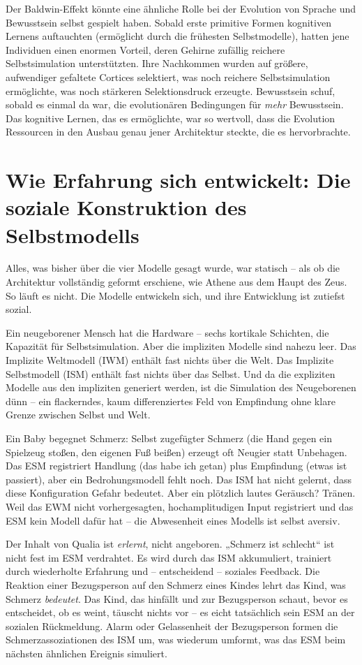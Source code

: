 \documentclass[11pt, twoside, openright]{book}
\begin{document}
Der Baldwin-Effekt könnte eine ähnliche Rolle bei der Evolution von Sprache und Bewusstsein selbst gespielt haben. Sobald erste primitive Formen kognitiven Lernens auftauchten (ermöglicht durch die frühesten Selbstmodelle), hatten jene Individuen einen enormen Vorteil, deren Gehirne zufällig reichere Selbstsimulation unterstützten. Ihre Nachkommen wurden auf größere, aufwendiger gefaltete Cortices selektiert, was noch reichere Selbstsimulation ermöglichte, was noch stärkeren Selektionsdruck erzeugte. Bewusstsein schuf, sobald es einmal da war, die evolutionären Bedingungen für \textit{mehr} Bewusstsein. Das kognitive Lernen, das es ermöglichte, war so wertvoll, dass die Evolution Ressourcen in den Ausbau genau jener Architektur steckte, die es hervorbrachte.

\section*{Wie Erfahrung sich entwickelt: Die soziale Konstruktion des Selbstmodells}

Alles, was bisher über die vier Modelle gesagt wurde, war statisch -- als ob die Architektur vollständig geformt erschiene, wie Athene aus dem Haupt des Zeus. So läuft es nicht. Die Modelle entwickeln sich, und ihre Entwicklung ist zutiefst sozial.

Ein neugeborener Mensch hat die Hardware -- sechs kortikale Schichten, die Kapazität für Selbstsimulation. Aber die impliziten Modelle sind nahezu leer. Das Implizite Weltmodell (IWM) enthält fast nichts über die Welt. Das Implizite Selbstmodell (ISM) enthält fast nichts über das Selbst. Und da die expliziten Modelle aus den impliziten generiert werden, ist die Simulation des Neugeborenen dünn -- ein flackerndes, kaum differenziertes Feld von Empfindung ohne klare Grenze zwischen Selbst und Welt.

Ein Baby begegnet Schmerz: Selbst zugefügter Schmerz (die Hand gegen ein Spielzeug stoßen, den eigenen Fuß beißen) erzeugt oft Neugier statt Unbehagen. Das ESM registriert Handlung (das habe ich getan) plus Empfindung (etwas ist passiert), aber ein Bedrohungsmodell fehlt noch. Das ISM hat nicht gelernt, dass diese Konfiguration Gefahr bedeutet. Aber ein plötzlich lautes Geräusch? Tränen. Weil das EWM nicht vorhergesagten, hochamplitudigen Input registriert und das ESM kein Modell dafür hat -- die Abwesenheit eines Modells ist selbst aversiv.

Der Inhalt von Qualia ist \textit{erlernt}, nicht angeboren. „Schmerz ist schlecht“ ist nicht fest im ESM verdrahtet. Es wird durch das ISM akkumuliert, trainiert durch wiederholte Erfahrung und -- entscheidend -- soziales Feedback. Die Reaktion einer Bezugsperson auf den Schmerz eines Kindes lehrt das Kind, was Schmerz \textit{bedeutet}. Das Kind, das hinfällt und zur Bezugsperson schaut, bevor es entscheidet, ob es weint, täuscht nichts vor -- es eicht tatsächlich sein ESM an der sozialen Rückmeldung. Alarm oder Gelassenheit der Bezugsperson formen die Schmerzassoziationen des ISM um, was wiederum umformt, was das ESM beim nächsten ähnlichen Ereignis simuliert.
\end{document}
